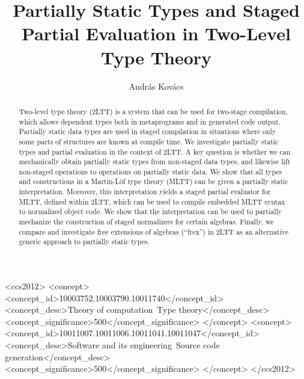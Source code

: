 \documentclass[acmsmall,review,screen]{acmart}
\theoremstyle{remark}
\begin{document}
\title{Partially Static Types and Staged Partial Evaluation in Two-Level Type Theory}

\author{András Kovács}

\begin{abstract}
  Two-level type theory (2LTT) is a system that can be used for two-stage
  compilation, which allows dependent types both in metaprograms and in
  generated code output. Partially static data types are used in staged
  compilation in situations where only some parts of structures are known at
  compile time. We investigate partially static types and partial evaluation in
  the context of 2LTT. A key question is whether we can mechanically obtain
  partially static types from non-staged data types, and likewise lift
  non-staged operations to operations on partially static data. We show that all
  types and constructions in a Martin-Löf type theory (MLTT) can be given a
  partially static interpretation. Moreover, this interpretation yields a staged
  partial evaluator for MLTT, defined within 2LTT, which can be used to compile
  embedded MLTT syntax to normalized object code. We show that the
  interpretation can be used to partially mechanize the construction of staged
  normalizers for certain algebras. Finally, we compare and investigate free
  extensions of algebras (``frex'') in 2LTT as an alternative generic approach to
  partially static types.
\end{abstract}

\begin{CCSXML}
<ccs2012>
   <concept>
       <concept_id>10003752.10003790.10011740</concept_id>
       <concept_desc>Theory of computation~Type theory</concept_desc>
       <concept_significance>500</concept_significance>
       </concept>
   <concept>
       <concept_id>10011007.10011006.10011041.10011047</concept_id>
       <concept_desc>Software and its engineering~Source code generation</concept_desc>
       <concept_significance>500</concept_significance>
       </concept>
 </ccs2012>
\end{CCSXML}
\end{document}
